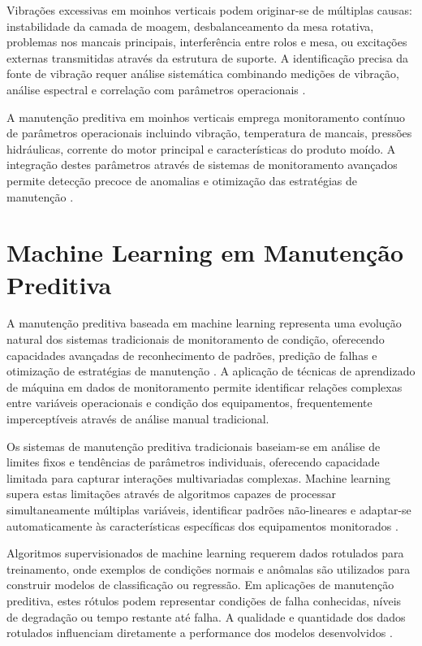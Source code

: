 Vibrações excessivas em moinhos verticais podem originar-se de múltiplas causas: instabilidade da camada de moagem, desbalanceamento da mesa rotativa, problemas nos mancais principais, interferência entre rolos e mesa, ou excitações externas transmitidas através da estrutura de suporte. A identificação precisa da fonte de vibração requer análise sistemática combinando medições de vibração, análise espectral e correlação com parâmetros operacionais \cite{reichardt2004vertical}.

A manutenção preditiva em moinhos verticais emprega monitoramento contínuo de parâmetros operacionais incluindo vibração, temperatura de mancais, pressões hidráulicas, corrente do motor principal e características do produto moído. A integração destes parâmetros através de sistemas de monitoramento avançados permite detecção precoce de anomalias e otimização das estratégias de manutenção \cite{holderbank1993mill}.

\section{Machine Learning em Manutenção Preditiva}
\label{sec:ml-manutencao}

A manutenção preditiva baseada em machine learning representa uma evolução natural dos sistemas tradicionais de monitoramento de condição, oferecendo capacidades avançadas de reconhecimento de padrões, predição de falhas e otimização de estratégias de manutenção \cite{lee2014prognostics}. A aplicação de técnicas de aprendizado de máquina em dados de monitoramento permite identificar relações complexas entre variáveis operacionais e condição dos equipamentos, frequentemente imperceptíveis através de análise manual tradicional.

Os sistemas de manutenção preditiva tradicionais baseiam-se em análise de limites fixos e tendências de parâmetros individuais, oferecendo capacidade limitada para capturar interações multivariadas complexas. Machine learning supera estas limitações através de algoritmos capazes de processar simultaneamente múltiplas variáveis, identificar padrões não-lineares e adaptar-se automaticamente às características específicas dos equipamentos monitorados \cite{susto2015machine}.

Algoritmos supervisionados de machine learning requerem dados rotulados para treinamento, onde exemplos de condições normais e anômalas são utilizados para construir modelos de classificação ou regressão. Em aplicações de manutenção preditiva, estes rótulos podem representar condições de falha conhecidas, níveis de degradação ou tempo restante até falha. A qualidade e quantidade dos dados rotulados influenciam diretamente a performance dos modelos desenvolvidos \cite{carvalho2019systematic}.

